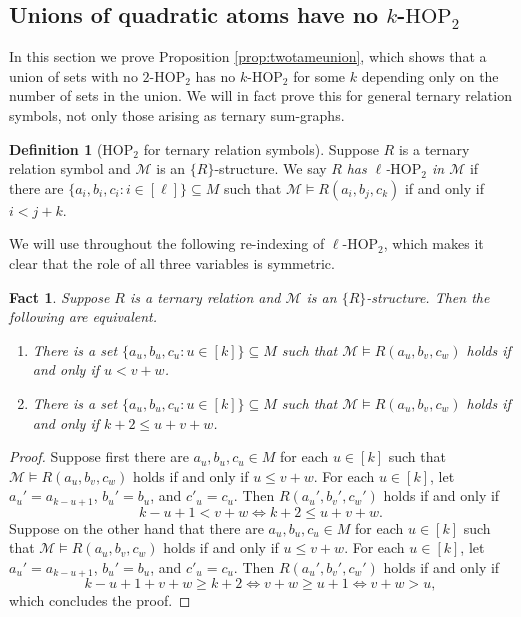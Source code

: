 \documentclass[12pt,oneside,british,a4wide]{amsart}
\newtheorem{fact}[theorem]{Fact}
\numberwithin{equation}{section}
\theoremstyle{definition}
\newtheorem{definition}[theorem]{Definition}
\def\HOP{\mathrm{HOP}}
\newcommand{\calM}{\mathcal{M}}
\begin{document}
\subsection{Unions of quadratic atoms have no $k$-$\HOP_2$} \label{app:boolean}



In this section we prove Proposition \ref{prop:twotameunion}, which shows that a union of sets with no $2$-$\HOP_2$ has no $k$-$\HOP_2$ for some $k$ depending only on the number of sets in the union.  We will in fact prove this for general ternary relation symbols, not only those arising as ternary sum-graphs.

\begin{definition}[$\HOP_2$ for ternary relation symbols]\label{def:hoprel}
Suppose $R$ is a ternary relation symbol and $\calM$ is an $\{R\}$-structure.  We say $R$ \emph{has $\ell$-$\HOP_2$ in $\calM$} if there are $\{a_i,b_i,c_i: i\in [\ell]\}\subseteq M$ such that $\calM\models R(a_i,b_j,c_k)$ if and only if $i<j+k$.
\end{definition}

We will use throughout the following re-indexing of $\ell$-$\HOP_2$, which makes it clear that the role of all three variables is symmetric.

\begin{fact}\label{fact:reindex}
Suppose $R$ is a ternary relation and $\calM$ is an $\{R\}$-structure.  Then the following are equivalent.
\begin{enumerate}[label=\normalfont(\arabic*)]
\item There is a set $\{a_u,b_u,c_u:u\in [k]\}\subseteq M$ such that $\calM\models R(a_u, b_v,c_w)$ holds if and only if $u< v+w$.  
\item There is a set $\{a_u,b_u,c_u:u\in [k]\}\subseteq M$ such that $\calM\models R(a_u, b_v,c_w)$ holds if and only if $k+2\leq u+ v+w$.  
\end{enumerate}
\end{fact}
\begin{proof}
Suppose first there are $a_u,b_u,c_u\in M$ for each $u\in [k]$ such that $\calM\models R(a_u, b_v,c_w)$ holds if and only if $u\leq v+w$.  For each $u\in [k]$, let $a_u'=a_{k-u+1}$, $b_u'=b_{u}$, and $c'_u=c_{u}$.  Then $R(a_u',b_v',c_w')$ holds if and only if 
$$
k-u+1< v+w \Leftrightarrow k+2\leq u+v+w.
$$
Suppose on the other hand that there are $a_u,b_u,c_u\in M$ for each $u\in [k]$ such that $\calM\models R(a_u, b_v,c_w)$ holds if and only if $u\leq v+w$. For each $u\in [k]$, let $a_u'=a_{k-u+1}$, $b_u'=b_{u}$, and $c'_u=c_{u}$.  Then $R(a_u',b_v',c_w')$ holds if and only if 
$$
k-u+1+v+w \geq k+2 \Leftrightarrow v+w\geq u+1\Leftrightarrow v+w>u,
$$
which concludes the proof.
\end{proof}
\end{document}
